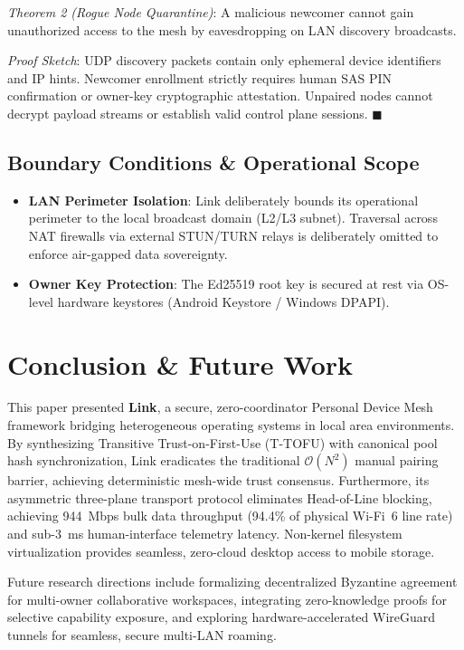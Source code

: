 \documentclass[conference]{IEEEtran}
\begin{document}
\textit{Theorem 2 (Rogue Node Quarantine)}: A malicious newcomer cannot gain unauthorized access to the mesh by eavesdropping on LAN discovery broadcasts.

\textit{Proof Sketch}: UDP discovery packets contain only ephemeral device identifiers and IP hints. Newcomer enrollment strictly requires human SAS PIN confirmation or owner-key cryptographic attestation. Unpaired nodes cannot decrypt payload streams or establish valid control plane sessions. $\blacksquare$

\subsection{Boundary Conditions \& Operational Scope}
\begin{itemize}
    \item \textbf{LAN Perimeter Isolation}: Link deliberately bounds its operational perimeter to the local broadcast domain (L2/L3 subnet). Traversal across NAT firewalls via external STUN/TURN relays is deliberately omitted to enforce air-gapped data sovereignty.
    \item \textbf{Owner Key Protection}: The Ed25519 root key is secured at rest via OS-level hardware keystores (Android Keystore / Windows DPAPI).
\end{itemize}

\section{Conclusion \& Future Work}
\label{sec:conclusion}
This paper presented \textbf{Link}, a secure, zero-coordinator Personal Device Mesh framework bridging heterogeneous operating systems in local area environments. By synthesizing Transitive Trust-on-First-Use (T-TOFU) with canonical pool hash synchronization, Link eradicates the traditional $\mathcal{O}(N^2)$ manual pairing barrier, achieving deterministic mesh-wide trust consensus. Furthermore, its asymmetric three-plane transport protocol eliminates Head-of-Line blocking, achieving 944~Mbps bulk data throughput (94.4\% of physical Wi-Fi~6 line rate) and sub-3~ms human-interface telemetry latency. Non-kernel filesystem virtualization provides seamless, zero-cloud desktop access to mobile storage.

Future research directions include formalizing decentralized Byzantine agreement for multi-owner collaborative workspaces, integrating zero-knowledge proofs for selective capability exposure, and exploring hardware-accelerated WireGuard tunnels for seamless, secure multi-LAN roaming.
\end{document}
